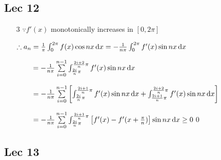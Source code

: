 \subsection{Lec 12}
\begin{enumerate}[1]

    \item [3]
    $\because f'(x)$ monotonically increases in $[0,2\pi]$
    \par $\therefore a_n
    =\frac{1}{\pi}\int_{0}^{2\pi}f(x)\cos nx\dif x=-\frac{1}{n\pi}\int_{0}^{2\pi}f'(x)\sin nx\dif x $
    \par $\phantom{\therefore a_n}=-\frac{1}{n\pi}\sum \limits_{i=0}^{n-1}\int_{\frac{2i}{n}\pi}^{\frac{2i+2}{n}\pi}f'(x)\sin nx\dif x $
    \par $\phantom{\therefore a_n}=-\frac{1}{n\pi}\sum \limits_{i=0}^{n-1}\left[ \int_{\frac{2i}{n}\pi}^{\frac{2i+1}{n}\pi}f'(x)\sin nx\dif x + \int_{\frac{2i+1}{n}\pi}^{\frac{2i+2}{n}\pi}f'(x)\sin nx\dif x \right] $
    \par $\phantom{\therefore a_n}=-\frac{1}{n\pi}\sum \limits_{i=0}^{n-1}\int_{\frac{2i}{n}\pi}^{\frac{2i+1}{n}\pi}\left[ f'(x)-f'(x+\frac{\pi}{n})\right]\sin nx\dif x \geq 0$\qed
\end{enumerate}

\subsection{Lec 13}

